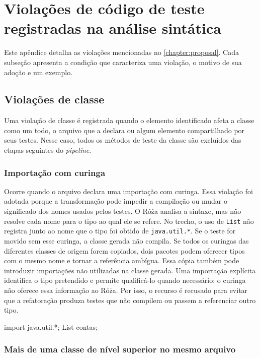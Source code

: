 \chapter{Violações de código de teste registradas na análise sintática}
\label{appendix:test-code-violations}

Este apêndice detalha as violações mencionadas no \autoref{chapter:proposal}. Cada subseção apresenta a condição que caracteriza uma violação, o motivo de sua adoção e um exemplo.

\section{Violações de classe}

Uma violação de classe é registrada quando o elemento identificado afeta a classe como um todo, o arquivo que a declara ou algum elemento compartilhado por seus testes. Nesse caso, todos os métodos de teste da classe são excluídos das etapas seguintes do \textit{pipeline}.

\subsection{Importação com curinga}

Ocorre quando o arquivo declara uma importação com curinga. Essa violação foi adotada porque a transformação pode impedir a compilação ou mudar o significado dos nomes usados pelos testes. O Róża analisa a sintaxe, mas não resolve cada nome para o tipo ao qual ele se refere. No trecho, o uso de \texttt{List} não registra junto ao nome que o tipo foi obtido de \texttt{java.util.*}. Se o teste for movido sem esse curinga, a classe gerada não compila. Se todos os curingas das diferentes classes de origem forem copiados, dois pacotes podem oferecer tipos com o mesmo nome e tornar a referência ambígua. Essa cópia também pode introduzir importações não utilizadas na classe gerada. Uma importação explícita identifica o tipo pretendido e permite qualificá-lo quando necessário; o curinga não oferece essa informação ao Róża. Por isso, o recurso é recusado para evitar que a refatoração produza testes que não compilem ou passem a referenciar outro tipo.

\begin{violationexample}
import java.util.*;
List contas;
\end{violationexample}

\subsection{Mais de uma classe de nível superior no mesmo arquivo}

